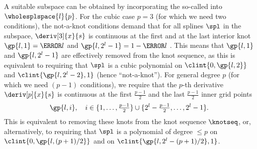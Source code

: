 A suitable subspace can be obtained by incorporating the
so-called  into $\wholesplspace{l}{p}$.
For the cubic case $p = 3$
(for which we need two conditions),
the not-a-knot conditions demand that
for all splines $\spl$ in the subspace,
$\deriv[3]{x}{s}$ is continuous at the first and at the last
interior knot $\gp{l,1} = \ms{l}$ and $\gp{l,2^l-1} = 1 - \ms{l}$
\cite{Hoellig13Approximation}.
This means that
$\gp{l,1}$ and $\gp{l,2^l-1}$ are effectively removed from the
knot sequence, as this is equivalent to requiring that
$\spl$ is a cubic polynomial on $\clint{0, \gp{l,2}}$ and
$\clint{\gp{l,2^l-2}, 1}$ (hence ``not-a-knot'').
For general degree $p$ (for which we need $(p - 1)$ conditions),
we require that the $p$-th derivative $\deriv[p]{x}{s}$
is continuous at the first $\tfrac{p-1}{2}$ and the last $\tfrac{p-1}{2}$
inner grid points
\begin{equation}
  \label{eq:removedNAKKnots}
  \gp{l,i},\quad
  i \in \{1, \dotsc, \tfrac{p-1}{2}\} \cup
  \{2^l - \tfrac{p-1}{2}, \dotsc, 2^l - 1\}.
\end{equation}
This is equivalent to removing these knots
from the knot sequence $\knotseq$,
or, alternatively, to requiring that $\spl$ is a polynomial
of degree $\le p$ on $\clint{0, \gp{l,(p+1)/2}}$ and on
$\clint{\gp{l,2^l-(p+1)/2}, 1}$.

